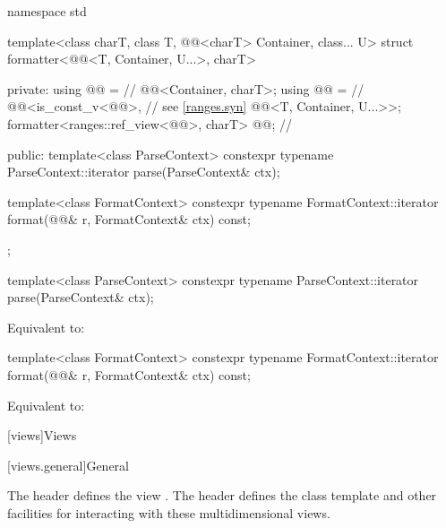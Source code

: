 %
\begin{codeblock}
namespace std {
  template<class charT, class T, @@<charT> Container, class... U>
  struct formatter<@@<T, Container, U...>, charT> {
  private:
    using @@ =                                             // \expos
      @@<Container, charT>;
    using @@ =                                               // \expos
      @@<is_const_v<@@>,                          // see \ref{ranges.syn}
                  @@<T, Container, U...>>;
    formatter<ranges::ref_view<@@>, charT> @@;    // \expos

  public:
    template<class ParseContext>
      constexpr typename ParseContext::iterator
        parse(ParseContext& ctx);

    template<class FormatContext>
      constexpr typename FormatContext::iterator
        format(@@& r, FormatContext& ctx) const;
  };
}
\end{codeblock}

%
\begin{itemdecl}
template<class ParseContext>
  constexpr typename ParseContext::iterator
    parse(ParseContext& ctx);
\end{itemdecl}

\begin{itemdescr}
\pnum
\effects
Equivalent to: 
\end{itemdescr}

%
\begin{itemdecl}
template<class FormatContext>
  constexpr typename FormatContext::iterator
    format(@@& r, FormatContext& ctx) const;
\end{itemdecl}

\begin{itemdescr}
\pnum
\effects
Equivalent to: 
\end{itemdescr}

[views]{Views}

[views.general]{General}

\pnum
The header  defines the view .
The header  defines the class template  and
other facilities for interacting with these multidimensional views.

